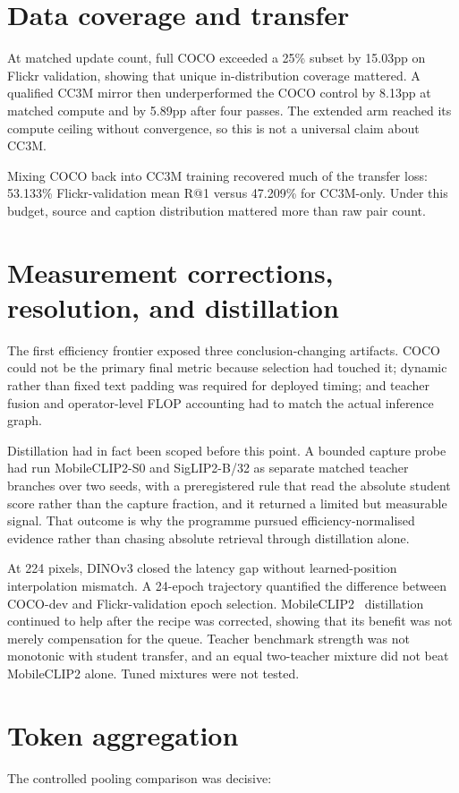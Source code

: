 \documentclass[11pt,a4paper,oneside]{report}
\begin{document}
\section{Data coverage and transfer}
At matched update count, full COCO exceeded a 25\% subset by 15.03pp on Flickr validation, showing that unique in-distribution coverage mattered. A qualified CC3M mirror then underperformed the COCO control by 8.13pp at matched compute and by 5.89pp after four passes. The extended arm reached its compute ceiling without convergence, so this is not a universal claim about CC3M.

Mixing COCO back into CC3M training recovered much of the transfer loss: 53.133\% Flickr-validation mean R@1 versus 47.209\% for CC3M-only. Under this budget, source and caption distribution mattered more than raw pair count.

\section{Measurement corrections, resolution, and distillation}
The first efficiency frontier exposed three conclusion-changing artifacts. COCO could not be the primary final metric because selection had touched it; dynamic rather than fixed text padding was required for deployed timing; and teacher fusion and operator-level FLOP accounting had to match the actual inference graph.

Distillation had in fact been scoped before this point. A bounded capture probe had run MobileCLIP2-S0 and SigLIP2-B/32 as separate matched teacher branches over two seeds, with a preregistered rule that read the absolute student score rather than the capture fraction, and it returned a limited but measurable signal. That outcome is why the programme pursued efficiency-normalised evidence rather than chasing absolute retrieval through distillation alone.

At 224 pixels, DINOv3 closed the latency gap without learned-position interpolation mismatch. A 24-epoch trajectory quantified the difference between COCO-dev and Flickr-validation epoch selection. MobileCLIP2~\cite{faghri2025mobileclip2} distillation continued to help after the recipe was corrected, showing that its benefit was not merely compensation for the queue. Teacher benchmark strength was not monotonic with student transfer, and an equal two-teacher mixture did not beat MobileCLIP2 alone. Tuned mixtures were not tested.

\section{Token aggregation}
The controlled pooling comparison was decisive:
\end{document}
